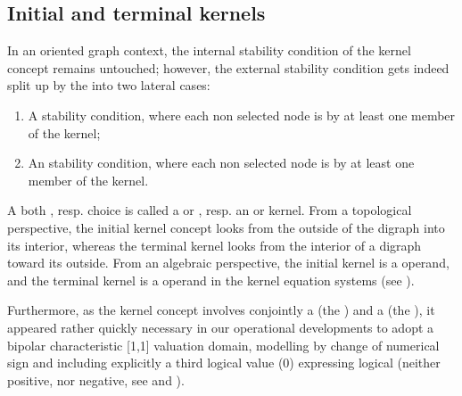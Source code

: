\documentclass[a4paper,12pt,english]{sphinxhowto}
\begin{document}
\subsection{Initial and terminal kernels}
\label{\detokenize{tutorial:initial-and-terminal-kernels}}
In an oriented graph context, the internal stability condition of the kernel concept remains untouched; however, the external stability condition gets indeed split up by the  into two lateral cases:
\begin{enumerate}
%
\item {} 
A  stability condition, where each non selected node is  by at least one member of the kernel;

\item {} 
An  stability condition, where each non selected node is  by at least one member of the kernel.

\end{enumerate}

A both   , resp.  choice is called a  or , resp. an  or  kernel. From a topological perspective, the initial kernel concept looks from the outside of the digraph into its interior, whereas the terminal kernel looks from the interior of a digraph toward its outside. From an algebraic perspective, the initial kernel is a  operand, and the terminal kernel is a  operand in the  kernel equation systems (see ).

Furthermore, as the kernel concept involves conjointly a  (the ) and a  (the ), it appeared rather quickly necessary in our operational developments to adopt a bipolar characteristic {[}\sphinxhyphen{}1,1{]} valuation domain, modelling  by change of numerical sign and including explicitly a third  logical value (0) expressing logical  (neither positive, nor negative, see  and ).
\end{document}
